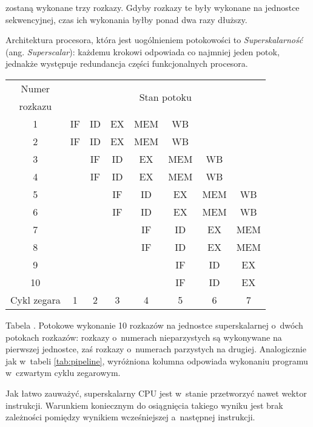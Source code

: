 \documentclass[12pt]{mwart}
\newcounter{tabmain}
\newcommand{\mytabcaption}[1]{ \begin{center}Tabela \arabic{tabmain}. #1.\end{center} \addtocounter{tabmain}{1} }
\begin{document}
	zostaną wykonane trzy rozkazy. Gdyby rozkazy te były wykonane na jednostce sekwencyjnej, czas ich wykonania byłby ponad dwa razy dłuższy.
\par
%
\indent
	Architektura procesora, która jest uogólnieniem potokowości to \emph{Superskalarność} (ang. \emph{Superscalar}): 
	każdemu krokowi odpowiada co najmniej jeden potok, jednakże występuje redundancja części funkcjonalnych procesora.
	\begin{center}
	\centering
	\begin{tabular}{|c|c|c|c|c|c|c|c|} \hline
	Numer 		 & \multicolumn{7}{c|}{\multirow{2}{*}{Stan potoku}} \\
	rozkazu & \multicolumn{7}{c|}{} \\ \hline
	1 & IF & ID & EX & \cellcolor{yellow} MEM & WB & & \\ \hline
	2 & IF & ID & EX & \cellcolor{yellow} MEM & WB & & \\ \hline
	3 & & IF & ID & \cellcolor{yellow} EX & MEM & WB & \\ \hline
	4 & & IF & ID & \cellcolor{yellow} EX & MEM & WB & \\ \hline
	5 & & & IF & \cellcolor{yellow} ID & EX & MEM & WB \\ \hline
	6 & & & IF & \cellcolor{yellow} ID & EX & MEM & WB \\ \hline
	7 & & & & \cellcolor{yellow} IF & ID & EX & MEM \\ \hline
	8 & & & & \cellcolor{yellow} IF & ID & EX & MEM \\ \hline
	9 & & & & \cellcolor{yellow} & IF & ID & EX \\ \hline
	10 & & & & \cellcolor{yellow} & IF & ID & EX \\ \hline \hline
	Cykl zegara & 1 & 2 & 3 & \cellcolor{yellow} 4 & 5 & 6 & 7 \\ \hline
	\end{tabular}
	\mytabcaption{Potokowe wykonanie 10 rozkazów na jednostce superskalarnej o~dwóch potokach rozkazów: rozkazy o~numerach nieparzystych są wykonywane na 
					pierwszej jednostce, zaś rozkazy o~numerach parzystych na drugiej. Analogicznie jak w~tabeli \ref{tab:pipeline}, wyróżniona
					kolumna odpowiada wykonaniu programu w~czwartym cyklu zegarowym}
	\end{center}
	Jak łatwo zauważyć, superskalarny CPU jest w~stanie przetworzyć nawet wektor instrukcji. Warunkiem koniecznym do osiągnięcia takiego
	wyniku jest brak zależności pomiędzy wynikiem wcześniejszej a~następnej instrukcji.
\par
\end{document}
